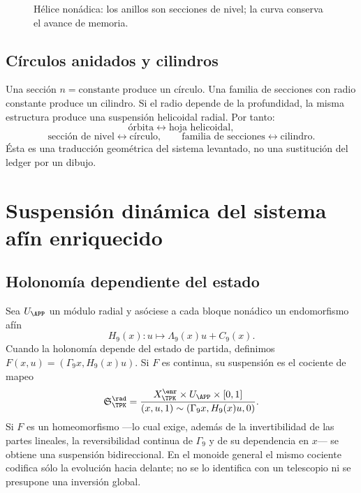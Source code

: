 \begin{figure}[htbp]
\centering
{}
\caption{Hélice nonádica: los anillos son secciones de nivel; la curva conserva el avance de memoria.}
\label{espiral:fig:helice-nonadica-analitica}
\end{figure}

\section{Círculos anidados y cilindros}

Una sección \(n=\text{constante}\) produce un círculo. Una familia de
secciones con radio constante produce un cilindro. Si el radio depende de la
profundidad, la misma estructura produce una suspensión helicoidal radial.
Por tanto:
\[
 \text{órbita}\longleftrightarrow\text{hoja helicoidal},
\]
\[
 \text{sección de nivel}\longleftrightarrow\text{círculo},
\qquad
 \text{familia de secciones}\longleftrightarrow\text{cilindro}.
\]
Ésta es una traducción geométrica del sistema levantado, no una sustitución
del ledger por un dibujo.

\chapter{Suspensión dinámica del sistema afín enriquecido}

\section{Holonomía dependiente del estado}

Sea \(U_{\APP}\) un módulo radial y asóciese a cada bloque nonádico un
endomorfismo afín
\[
 H_9(x):u\longmapsto\Lambda_9(x)u+C_9(x).
\]
Cuando la holonomía depende del estado de partida, definimos
\(F(x,u)=(\Gamma_9x,H_9(x)u)\). Si \(F\) es continua, su suspensión es
el cociente de mapeo
\begin{equation}
 \mathfrak S_{\TPK}^{\rad}
 =\frac{X_{\TPK}^{\enr}\times U_{\APP}\times[0,1]}
 {(x,u,1)\sim(\Gamma_9x,H_9(x)u,0)}.
 \label{espiral:eq:suspension-skew}
\end{equation}
Si \(F\) es un homeomorfismo ---lo cual exige, además de la invertibilidad
de las partes lineales, la reversibilidad continua de \(\Gamma_9\) y de su
dependencia en \(x\)--- se obtiene una suspensión bidireccional. En el
monoide general el mismo cociente codifica sólo la evolución hacia delante;
no se lo identifica con un telescopio ni se presupone una inversión global.

